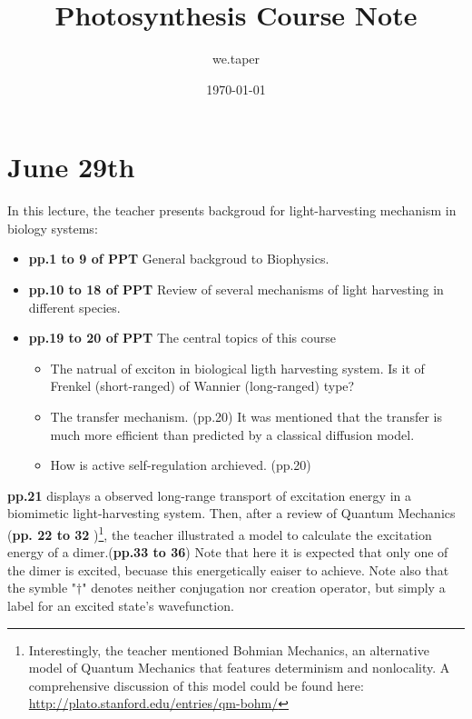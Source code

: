 \documentclass{article}
\title{Photosynthesis Course Note}
\date{\today}
\author{we.taper}
\numberwithin{equation}{subsection} %
\theoremstyle{definition}
\begin{document}
\maketitle

\tableofcontents

\section{June 29th}
\label{sec:June_29th}

In this lecture, the teacher presents backgroud for light-harvesting
mechanism in biology systems:
\begin{itemize}
    \item \textbf{pp.1 to 9 of PPT} 
        General backgroud to Biophysics.
    \item \textbf{pp.10 to 18 of PPT}
        Review of several mechanisms of light harvesting in different 
        species.
    \item \textbf{pp.19 to 20 of PPT}
        The central topics of this course
        \begin{itemize}
            \item The natrual of exciton in biological ligth harvesting 
                system.
                Is it of Frenkel (short-ranged) of Wannier (long-ranged) type?
            \item The transfer mechanism. (pp.20) It was mentioned that
                the transfer is much more efficient than predicted
                by a classical diffusion model.
            \item How is active self-regulation archieved. (pp.20)
        \end{itemize}
\end{itemize}
\textbf{pp.21} displays a observed long-range transport of excitation
    energy in a biomimetic light-harvesting system.
Then, after a review of Quantum Mechanics (\textbf{pp. 22 to 32} )\footnote{
    Interestingly, the teacher mentioned Bohmian Mechanics, an alternative
    model of Quantum Mechanics that features determinism and nonlocality.
    A comprehensive discussion of this model could be found here:
    \url{http://plato.stanford.edu/entries/qm-bohm/}
}, the teacher illustrated a model to calculate
the excitation energy of a dimer.(\textbf{pp.33 to 36})
Note that here it is expected that only one of the
dimer is excited, becuase this energetically eaiser to achieve.
Note also that the
symble "$\dagger$" denotes neither conjugation nor creation operator,
but simply a label for an excited state's wavefunction. 
\end{document}
